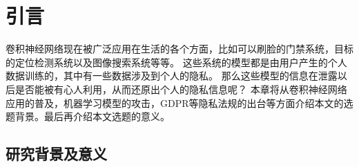 
\chapter{引言}

卷积神经网络现在被广泛应用在生活的各个方面，比如可以刷脸的门禁系统，目标的定位检测系统以及图像搜索系统等等。
这些系统的模型都是由用户产生的个人数据训练的，其中有一些数据涉及到个人的隐私。
那么这些模型的信息在泄露以后是否能被有心人利用，从而还原出个人的隐私信息呢？
本章将从卷积神经网络应用的普及，机器学习模型的攻击，GDPR等隐私法规的出台等方面介绍本文的选题背景。最后再介绍本文选题的意义。


\section{研究背景及意义}


